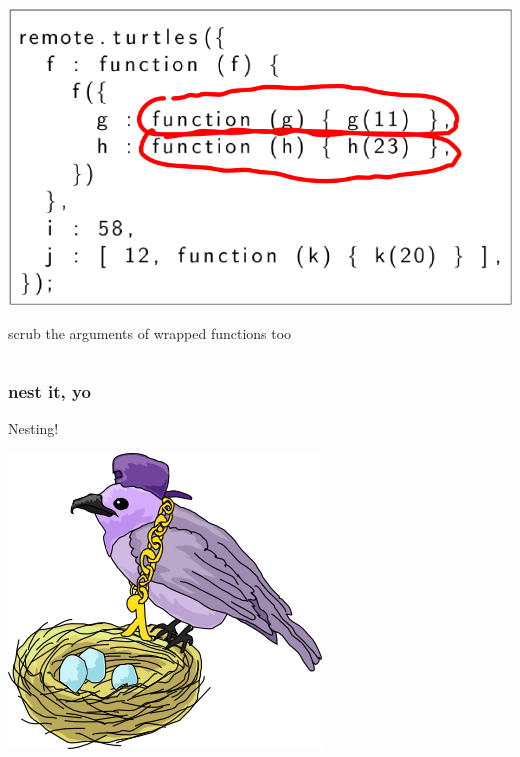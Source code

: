 \documentclass{beamer}
\begin{document}
\begin{frame}
\begin{columns}[c]
\begin{center}
        \includegraphics[scale=0.28]{images/scrub_2.png}
        \newline
        
        \huge
        scrub the arguments of wrapped functions too
        
        \end{center}
    \end{columns}
\end{frame}

\begin{frame}
    \frametitle{nest it, yo}
    \begin{center}
        \huge
        Nesting!
        \newline
        
        \includegraphics[scale=0.5]{images/nest.png}
    \end{center}
\end{frame}
\end{document}
